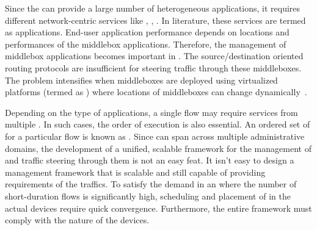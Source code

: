 Since the  can provide a large number of heterogeneous applications, it requires different network-centric services like , , . In literature, these services are termed as  applications. End-user application performance depends on locations and performances of the middlebox applications. Therefore, the management of middlebox applications becomes important in . The source/destination oriented routing protocols are insufficient for steering traffic through these middleboxes. The problem intensifies when middleboxes are deployed using virtualized platforms (termed as ) where locations of middleboxes can change dynamically~\cite{haeffner2015service,panda:eecs-2017-141,8696424}. 

Depending on the type of applications, a single flow may require services from multiple . In such cases, the order of execution is also essential. An ordered set of  for a particular flow is known as . Since  can span across multiple administrative domains, the development of a unified, scalable framework for the management of  and traffic steering through them is not an easy feat. It isn't easy to design a  management framework that is scalable and still capable of providing  requirements of the traffics. To satisfy the  demand in an  where the number of short-duration flows is significantly high, scheduling and placement of  in the actual devices require quick convergence. Furthermore, the entire framework must comply with the  nature of the  devices.
